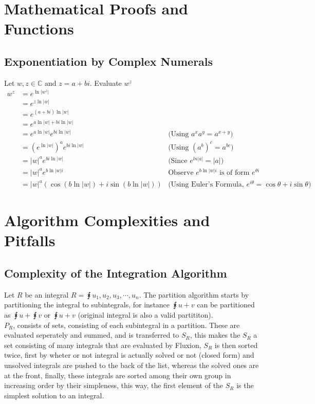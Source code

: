 \documentclass[11pt,a4paper]{book}
\begin{document}
\appendix

\chapter{Mathematical Proofs and Functions}
\section{Exponentiation by Complex Numerals}
Let $w, z \in \mathbb{C}$ and $z = a + bi$. Evaluate $w^z$
\begin{align*}
w^z & = e^{\ln|w^z|} & \\
& = e^{z\ln|w|} & \\
& = e^{(a + bi)\ln|w|} & \\
& = e^{a\ln|w| + bi\ln|w|} & \\
& = e^{a\ln|w|}e^{bi\ln|w|} & \text{(Using $a^xa^y = a^{x+y}$)}\\
& = \left(e^{\ln|w|}\right)^a e^{bi\ln|w|}  & \text{(Using $\left(a^{b}\right)^c = a^{bc}$)}\\
& = |w|^ae^{bi\ln|w|} & \text{(Since $e^{ln|a|} = |a|$)} \\
& = |w|^ae^{b\ln|w|i} & \text{Observe $e^{b\ln|w|i}$ is of form $e^{\theta i}$}\\
& = |w|^a\left(\cos\left(b\ln|w|\right) + i \sin\left(b\ln|w|\right) \right) & \text{(Using Euler's Formula, $e^{i\theta} = \cos\theta + i\sin\theta$)}
\end{align*}

\chapter{Algorithm Complexities and Pitfalls}

\section{Complexity of the Integration Algorithm}

Let $R$ be an integral $R = \intx{u_1, u_2, u_3, \cdots, u_n}$. The partition algorithm starts by partitioning the integral to subintegrals, for instance $\intx{u + v}$ can be partitioned as $\intx{u} + \intx{v}$ or $\intx{u + v}$ (original integral is also a valid partititon).\\

$P_R$, consists of sets, consisting of each subintegral in a partition. These are evaluated seperately and summed, and is transferred to $S_R$, this makes the $S_R$ a set consisting of many integrals that are evaluated by Fluxion, $S_R$ is then sorted twice, first by wheter or not integral is actually solved or not (closed form) and unsolved integrals are pushed to the back of the list, whereas the solved ones are at the front, finally, these integrals are sorted among their own group in increasing order by their simpleness, this way, the first element of the $S_R$ is the simplest solution to an integral.\\
\end{document}
